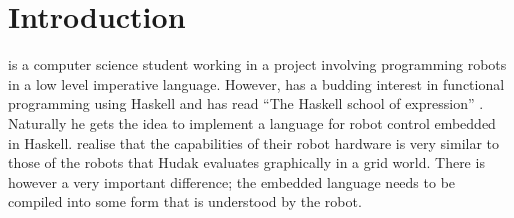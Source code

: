 



% 






% 



\section{Introduction}
\studname{} is a computer science student working in a project involving programming 
robots in a low level imperative language. However, \studname{} has a budding 
interest in functional programming using Haskell and has read ``The Haskell 
school of expression'' \cite{HUDAK}. Naturally he gets the idea to implement 
a language for robot control embedded in Haskell. \studname{} realise that the 
capabilities of their robot hardware is very similar to those of the 
robots that Hudak evaluates graphically in a grid world. There is however 
a very important difference; the embedded language needs to be compiled into 
some form that is understood by the robot. 

